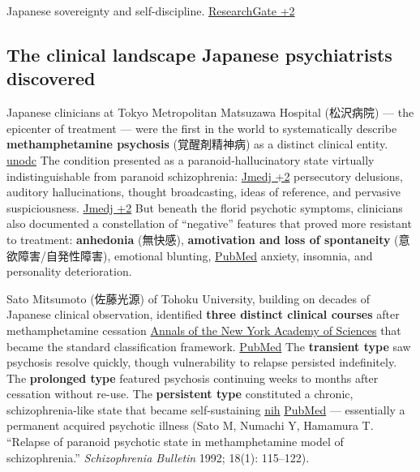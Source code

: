 Japanese sovereignty and self-discipline. \href{https://www.researchgate.net/publication/259431765_Methamphetamine_Solution_Drugs_and_the_Reconstruction_of_Nation_in_Postwar_Japan}{ResearchGate +2}

\subsection{The clinical landscape Japanese psychiatrists discovered}\label{12_philopon-the-clinical-landscape-japanese-psychiatrists-discovered}

Japanese clinicians at Tokyo Metropolitan Matsuzawa Hospital (松沢病院) --- the epicenter of treatment --- were the first in the world to systematically describe \textbf{methamphetamine psychosis} (覚醒剤精神病) as a distinct clinical entity. \href{https://www.unodc.org/unodc/en/data-and-analysis/bulletin/bulletin_1989-01-01_1_page007.html}{unodc} The condition presented as a paranoid-hallucinatory state virtually indistinguishable from paranoid schizophrenia: \href{https://www.jmedj.co.jp/journal/paper/detail.php?id=4742}{Jmedj +2} persecutory delusions, auditory hallucinations, thought broadcasting, ideas of reference, and pervasive suspiciousness. \href{https://www.jmedj.co.jp/journal/paper/detail.php?id=4742}{Jmedj +2} But beneath the florid psychotic symptoms, clinicians also documented a constellation of ``negative'' features that proved more resistant to treatment: \textbf{anhedonia} (無快感), \textbf{amotivation and loss of spontaneity} (意欲障害/自発性障害), emotional blunting, \href{https://pubmed.ncbi.nlm.nih.gov/11085303/}{PubMed} anxiety, insomnia, and personality deterioration.

Sato Mitsumoto (佐藤光源) of Tohoku University, building on decades of Japanese clinical observation, identified \textbf{three distinct clinical courses} after methamphetamine cessation \href{https://nyaspubs.onlinelibrary.wiley.com/doi/abs/10.1196/annals.1316.035}{Annals of the New York Academy of Sciences} that became the standard classification framework. \href{https://pubmed.ncbi.nlm.nih.gov/15542728/}{PubMed} The \textbf{transient type} saw psychosis resolve quickly, though vulnerability to relapse persisted indefinitely. The \textbf{prolonged type} featured psychosis continuing weeks to months after cessation without re-use. The \textbf{persistent type} constituted a chronic, schizophrenia-like state that became self-sustaining \href{https://pubmed.ncbi.nlm.nih.gov/1553491/}{nih} \href{https://pubmed.ncbi.nlm.nih.gov/1553491/}{PubMed} --- essentially a permanent acquired psychotic illness (Sato M, Numachi Y, Hamamura T. ``Relapse of paranoid psychotic state in methamphetamine model of schizophrenia.'' \emph{Schizophrenia Bulletin} 1992; 18(1): 115--122).

